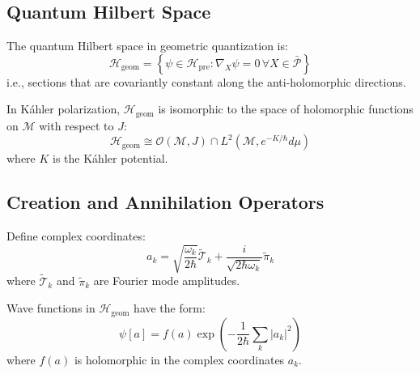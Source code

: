 \subsection{Quantum Hilbert Space}

\begin{definition}
The quantum Hilbert space in geometric quantization is:
\begin{equation}
    \mathcal{H}_{\text{geom}} = \left\{ \psi \in \mathcal{H}_{\text{pre}} : \nabla_X \psi = 0 \, \forall X \in \bar{\mathcal{P}} \right\}
\end{equation}
i.e., sections that are covariantly constant along the anti-holomorphic directions.
\end{definition}

\begin{theorem}
In K\'{a}hler polarization, $\mathcal{H}_{\text{geom}}$ is isomorphic to the space of holomorphic functions on $\mathcal{M}$ with respect to $J$:
\begin{equation}
    \mathcal{H}_{\text{geom}} \cong \mathcal{O}(\mathcal{M}, J) \cap L^2(\mathcal{M}, e^{-K/\hbar} d\mu)
\end{equation}
where $K$ is the K\'{a}hler potential.
\end{theorem}

\subsection{Creation and Annihilation Operators}

\begin{definition}
Define complex coordinates:
\begin{equation}
    a_k = \sqrt{\frac{\omega_k}{2\hbar}} \tilde{\mathcal{T}}_k + \frac{i}{\sqrt{2\hbar\omega_k}} \tilde{\pi}_k
\end{equation}
where $\tilde{\mathcal{T}}_k$ and $\tilde{\pi}_k$ are Fourier mode amplitudes.
\end{definition}

\begin{theorem}
Wave functions in $\mathcal{H}_{\text{geom}}$ have the form:
\begin{equation}
    \psi[a] = f(a) \exp\left(-\frac{1}{2\hbar} \sum_k |a_k|^2\right)
\end{equation}
where $f(a)$ is holomorphic in the complex coordinates $a_k$.
\end{theorem}


